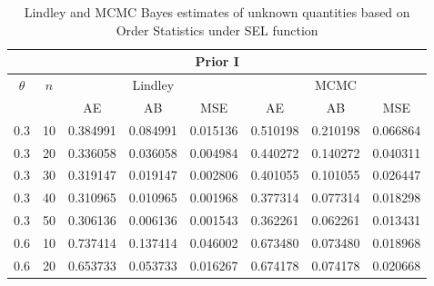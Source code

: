 \documentclass[11pt,a4paper]{article}
\numberwithin{equation}{section}
\begin{document}
	\begin{table}[htbp]

		\centering

		\caption{Lindley and MCMC Bayes estimates of unknown quantities based on Order Statistics under SEL function}

		\begin{tabular}{cc|ccc|ccc}

			\toprule

			\multicolumn{8}{c}{Prior I} \\

			\midrule

			\multirow{2}[4]{*}{$\theta$} & \multirow{2}[4]{*}{$n$} & \multicolumn{3}{c|}{Lindley} & \multicolumn{3}{c}{MCMC} \\

			\cmidrule{3-8}           &       & \multicolumn{1}{c|}{AE} & \multicolumn{1}{c|}{AB} & MSE   & \multicolumn{1}{c|}{AE} & \multicolumn{1}{c|}{AB} & \multicolumn{1}{c|}{MSE} \\

			\midrule

			0.3   & 10    & 0.384991 & 0.084991 & 0.015136 & \multicolumn{1}{r}{0.510198} & \multicolumn{1}{r}{0.210198} & \multicolumn{1}{r}{0.066864} \\

			0.3   & 20    & 0.336058 & 0.036058 & 0.004984 & \multicolumn{1}{r}{0.440272} & \multicolumn{1}{r}{0.140272} & \multicolumn{1}{r}{0.040311} \\

			0.3   & 30    & 0.319147 & 0.019147 & 0.002806 & \multicolumn{1}{r}{0.401055} & \multicolumn{1}{r}{0.101055} & \multicolumn{1}{r}{0.026447} \\

			0.3   & 40    & 0.310965 & 0.010965 & 0.001968 & \multicolumn{1}{r}{0.377314} & \multicolumn{1}{r}{0.077314} & \multicolumn{1}{r}{0.018298} \\

			0.3   & 50    & 0.306136 & 0.006136 & 0.001543 & \multicolumn{1}{r}{0.362261} & \multicolumn{1}{r}{0.062261} & \multicolumn{1}{r}{0.013431} \\

			0.6   & 10    & 0.737414 & 0.137414 & 0.046002 & \multicolumn{1}{r}{0.673480} & \multicolumn{1}{r}{0.073480} & \multicolumn{1}{r}{0.018968} \\

			0.6   & 20    & 0.653733 & 0.053733 & 0.016267 & \multicolumn{1}{r}{0.674178} & \multicolumn{1}{r}{0.074178} & \multicolumn{1}{r}{0.020668} \\


\end{tabular}
\end{table}
\end{document}
